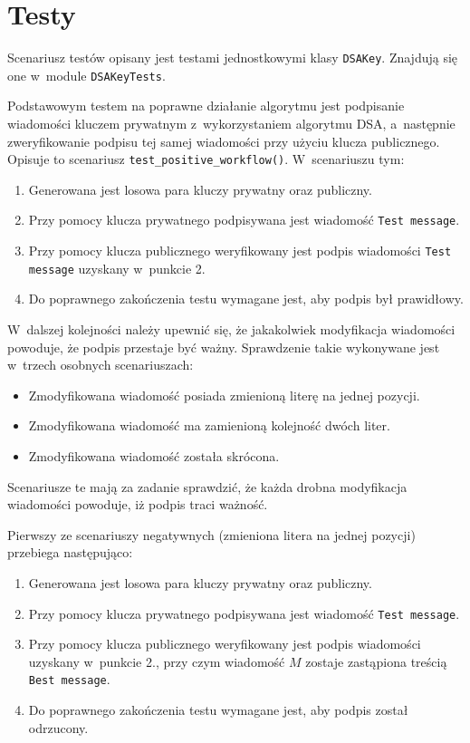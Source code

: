 \documentclass{article}
\begin{document}
    \section*{Testy}
    
        Scenariusz testów opisany jest testami jednostkowymi klasy \verb+DSAKey+. Znajdują się one w~module \verb+DSAKeyTests+.
        
        Podstawowym testem na poprawne działanie algorytmu jest podpisanie wiadomości kluczem prywatnym z~wykorzystaniem algorytmu DSA, a~następnie zweryfikowanie podpisu tej samej wiadomości przy użyciu klucza publicznego. Opisuje to scenariusz \verb+test_positive_workflow()+. W~scenariuszu tym:
        
        \begin{enumerate}
            \item Generowana jest losowa para kluczy prywatny oraz publiczny.
            \item Przy pomocy klucza prywatnego podpisywana jest wiadomość \verb+Test message+.
            \item Przy pomocy klucza publicznego weryfikowany jest podpis wiadomości \verb+Test message+ uzyskany w~punkcie 2.
            \item Do poprawnego zakończenia testu wymagane jest, aby podpis był prawidłowy.
        \end{enumerate}

        W~dalszej kolejności należy upewnić się, że jakakolwiek modyfikacja wiadomości powoduje, że podpis przestaje być ważny. Sprawdzenie takie wykonywane jest w~trzech osobnych scenariuszach:
        
        \begin{itemize}
            \item Zmodyfikowana wiadomość posiada zmienioną literę na jednej pozycji.
            \item Zmodyfikowana wiadomość ma zamienioną kolejność dwóch liter.
            \item Zmodyfikowana wiadomość została skrócona.
        \end{itemize}
        
\noindent Scenariusze te mają za zadanie sprawdzić, że każda drobna modyfikacja wiadomości powoduje, iż podpis traci ważność.

        Pierwszy ze scenariuszy negatywnych (zmieniona litera na jednej pozycji) przebiega następująco:
        
        \begin{enumerate}
            \item Generowana jest losowa para kluczy prywatny oraz publiczny.
            \item Przy pomocy klucza prywatnego podpisywana jest wiadomość \verb+Test message+.
            \item Przy pomocy klucza publicznego weryfikowany jest podpis wiadomości uzyskany w~punkcie 2., przy czym wiadomość $M$ zostaje zastąpiona treścią \verb+Best message+.
            \item Do poprawnego zakończenia testu wymagane jest, aby podpis został odrzucony.
        \end{enumerate}
\end{document}
